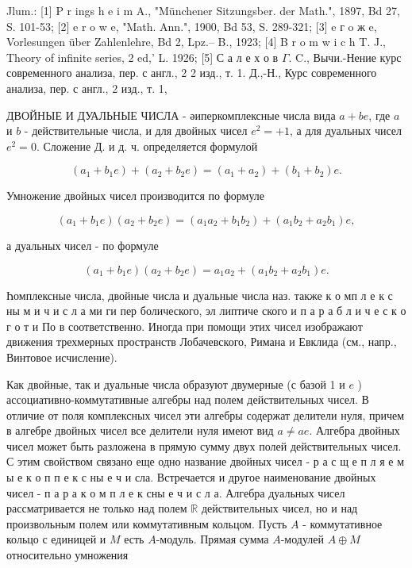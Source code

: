 \documentclass[10pt]{article}
\begin{document}
Jlum.: [1] P r ings h e i m A., "Münchener Sitzungsber. der Math.", 1897, Bd 27, S. 101-53; [2] e r o w e, "Math. Ann.", 1900, Bd 53, S. 289-321; [3] e г o ж e, Vorlesungen über Zahlenlehre, Bd 2, Lpz.-- B., 1923; [4] B r o m w i c h T. J., Theory of infinite series, 2 ed,' L. 1926; [5] С а л е х о в $\Gamma$. C., Вычи.-Нение курс современного анализа, пер. с англ., 2 2 изд., т. 1. Д.,-Н., Курс современного анализа, пер. с англ., 2 изд., т. 1,



ДВОЙНЫЕ И ДУАЛЬНЫЕ ЧИСЛА - әиперкомплексные числа вида $a+b e$, где $a$ и $b$ - действительные числа, и для двойных чисел $e^{2}=+1$, а для дуальных чисел $e^{2}=0$. Сложение Д. и д. ч. определяется формулой



\[

\left(a_{1}+b_{1} e\right)+\left(a_{2}+b_{2} e\right)=\left(a_{1}+a_{2}\right)+\left(b_{1}+b_{2}\right) e .

\]



Умножение двойных чисел производится по формуле



\[

\left(a_{1}+b_{1} e\right)\left(a_{2}+b_{2} e\right)=\left(a_{1} a_{2}+b_{1} b_{2}\right)+\left(a_{1} b_{2}+a_{2} b_{1}\right) e,

\]



а дуальных чисел - по формуле



\[

\left(a_{1}+b_{1} e\right)\left(a_{2}+b_{2} e\right)=a_{1} a_{2}+\left(a_{1} b_{2}+a_{2} b_{1}\right) e .

\]



Һомплексные числа, двойные числа и дуальные числа наз. также к о мп л е к с ны м и ч и с л а ми ги пер болического, эл липтиче ского и п а р а б л и ч е с к о г о т и По в соответственно. Иногда при помощи этих чисел изображают движения трехмерных пространств Лобачевского, Римана и Евклида (см., напр., Винтовое исчисление).



Как двойные, так и дуальные числа образуют двумерные (с базой 1 и $e$ ) ассоциативно-коммутативные алгебры над полем действительных чисел. В отличие от поля комплексных чисел эти алгебры содержат делители нуля, причем в алгебре двойных чисел все делители нуля имеют вид $a \neq a e$. Алгебра двойных чисел может быть разложена в прямую сумму двух полей действительных чисел. С этим свойством связано еще одно название двойных чисел - р а с щ е п л я е м ы е к о п п е к с ны е ч и сла. Встречается и другое наименование двойных чисел - п а р а к о м п л е к сны е ч и с л а. Алгебра дуальных чисел рассматривается не только над полем $\mathbb{R}$ действительных чисел, но и над произвольным полем или коммутативным кольцом. Пусть $A$ - коммутативное кольцо с единицей и $M$ есть $A$-модуль. Прямая сумма $A$-модулей $A \oplus M$ относительно умножения
\end{document}
